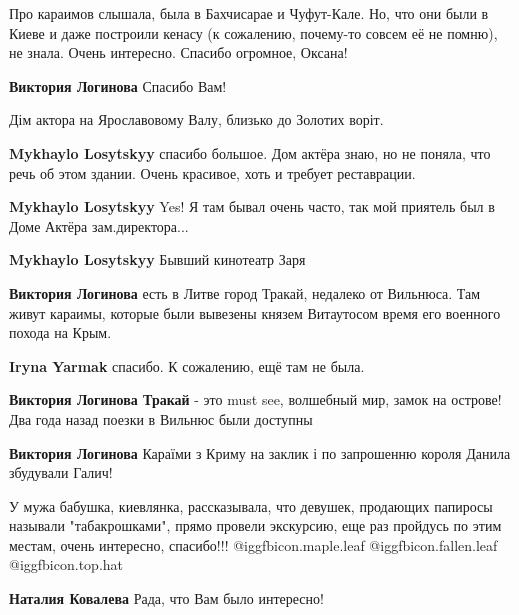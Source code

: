 \begin{itemize}

Про караимов слышала, была в Бахчисарае и Чуфут-Кале. Но, что они были в Киеве
и даже построили кенасу (к сожалению, почему-то совсем её не помню), не знала.
Очень интересно. Спасибо огромное, Оксана!

\begin{itemize} %
\textbf{Виктория Логинова} Спасибо Вам!

Дім актора на Ярославовому Валу, близько до Золотих воріт.

\begin{itemize} %
\textbf{Mykhaylo Losytskyy} спасибо большое. Дом актёра знаю, но не поняла, что речь об этом здании. Очень красивое, хоть и требует реставрации.

\textbf{Mykhaylo Losytskyy} Yes! Я там бывал очень часто, так мой приятель был в Доме Актёра зам.директора...

\textbf{Mykhaylo Losytskyy} Бывший кинотеатр Заря
\end{itemize} %

\textbf{Виктория Логинова} есть в Литве город Тракай, недалеко от Вильнюса. Там живут караимы, которые были вывезены князем Витаутосом время его военного похода на Крым.

\begin{itemize} %
\textbf{Iryna Yarmak} спасибо. К сожалению, ещё там не была.

\textbf{Виктория Логинова Тракай} - это must see, волшебный мир, замок на острове! Два года назад поезки в Вильнюс были доступны
\end{itemize} %

\textbf{Виктория Логинова} Караїми з Криму на заклик і по запрошенню короля Данила збудували Галич!
\end{itemize} %


У мужа бабушка, киевлянка, рассказывала, что девушек, продающих папиросы
называли "табакрошками", прямо провели экскурсию, еще раз пройдусь по этим
местам, очень интересно, спасибо!!! @igg{fbicon.maple.leaf}  @igg{fbicon.fallen.leaf}  @igg{fbicon.top.hat} 

\begin{itemize} %
\textbf{Наталия Ковалева} Рада, что Вам было интересно!
\end{itemize} %


\end{itemize}
